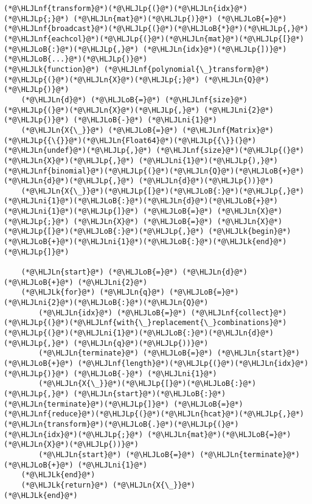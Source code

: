 \documentclass[12pt,a4paper]{article}
\newcommand{\HLJLk}[1]{\textcolor[RGB]{148,91,176}{\textbf{#1}}}
\newcommand{\HLJLn}[1]{#1}
\newcommand{\HLJLnf}[1]{\textcolor[RGB]{66,102,213}{#1}}
\newcommand{\HLJLni}[1]{\textcolor[RGB]{59,151,46}{#1}}
\newcommand{\HLJLoB}[1]{\textcolor[RGB]{102,102,102}{\textbf{#1}}}
\newcommand{\HLJLp}[1]{#1}
\begin{document}
\begin{lstlisting}
(*@\HLJLnf{transform}@*)(*@\HLJLp{(}@*)(*@\HLJLn{idx}@*)(*@\HLJLp{;}@*) (*@\HLJLn{mat}@*)(*@\HLJLp{)}@*) (*@\HLJLoB{=}@*) (*@\HLJLnf{broadcast}@*)(*@\HLJLp{(}@*)(*@\HLJLoB{*}@*)(*@\HLJLp{,}@*) (*@\HLJLnf{eachcol}@*)(*@\HLJLp{(}@*)(*@\HLJLn{mat}@*)(*@\HLJLp{[}@*)(*@\HLJLoB{:}@*)(*@\HLJLp{,}@*) (*@\HLJLn{idx}@*)(*@\HLJLp{])}@*)(*@\HLJLoB{...}@*)(*@\HLJLp{)}@*)
(*@\HLJLk{function}@*) (*@\HLJLnf{polynomial{\_}transform}@*)(*@\HLJLp{(}@*)(*@\HLJLn{X}@*)(*@\HLJLp{;}@*) (*@\HLJLn{Q}@*)(*@\HLJLp{)}@*)
    (*@\HLJLn{d}@*) (*@\HLJLoB{=}@*) (*@\HLJLnf{size}@*)(*@\HLJLp{(}@*)(*@\HLJLn{X}@*)(*@\HLJLp{,}@*) (*@\HLJLni{2}@*)(*@\HLJLp{)}@*) (*@\HLJLoB{-}@*) (*@\HLJLni{1}@*)
    (*@\HLJLn{X{\_}}@*) (*@\HLJLoB{=}@*) (*@\HLJLnf{Matrix}@*)(*@\HLJLp{{\{}}@*)(*@\HLJLn{Float64}@*)(*@\HLJLp{{\}}(}@*)(*@\HLJLn{undef}@*)(*@\HLJLp{,}@*) (*@\HLJLnf{size}@*)(*@\HLJLp{(}@*)(*@\HLJLn{X}@*)(*@\HLJLp{,}@*) (*@\HLJLni{1}@*)(*@\HLJLp{),}@*) (*@\HLJLnf{binomial}@*)(*@\HLJLp{(}@*)(*@\HLJLn{Q}@*)(*@\HLJLoB{+}@*)(*@\HLJLn{d}@*)(*@\HLJLp{,}@*) (*@\HLJLn{d}@*)(*@\HLJLp{))}@*)
    (*@\HLJLn{X{\_}}@*)(*@\HLJLp{[}@*)(*@\HLJLoB{:}@*)(*@\HLJLp{,}@*) (*@\HLJLni{1}@*)(*@\HLJLoB{:}@*)(*@\HLJLn{d}@*)(*@\HLJLoB{+}@*)(*@\HLJLni{1}@*)(*@\HLJLp{]}@*) (*@\HLJLoB{=}@*) (*@\HLJLn{X}@*)(*@\HLJLp{;}@*) (*@\HLJLn{X}@*) (*@\HLJLoB{=}@*) (*@\HLJLn{X}@*)(*@\HLJLp{[}@*)(*@\HLJLoB{:}@*)(*@\HLJLp{,}@*) (*@\HLJLk{begin}@*)(*@\HLJLoB{+}@*)(*@\HLJLni{1}@*)(*@\HLJLoB{:}@*)(*@\HLJLk{end}@*)(*@\HLJLp{]}@*)

    (*@\HLJLn{start}@*) (*@\HLJLoB{=}@*) (*@\HLJLn{d}@*) (*@\HLJLoB{+}@*) (*@\HLJLni{2}@*)
    (*@\HLJLk{for}@*) (*@\HLJLn{q}@*) (*@\HLJLoB{=}@*) (*@\HLJLni{2}@*)(*@\HLJLoB{:}@*)(*@\HLJLn{Q}@*)
        (*@\HLJLn{idx}@*) (*@\HLJLoB{=}@*) (*@\HLJLnf{collect}@*)(*@\HLJLp{(}@*)(*@\HLJLnf{with{\_}replacement{\_}combinations}@*)(*@\HLJLp{(}@*)(*@\HLJLni{1}@*)(*@\HLJLoB{:}@*)(*@\HLJLn{d}@*)(*@\HLJLp{,}@*) (*@\HLJLn{q}@*)(*@\HLJLp{))}@*)
        (*@\HLJLn{terminate}@*) (*@\HLJLoB{=}@*) (*@\HLJLn{start}@*) (*@\HLJLoB{+}@*) (*@\HLJLnf{length}@*)(*@\HLJLp{(}@*)(*@\HLJLn{idx}@*)(*@\HLJLp{)}@*) (*@\HLJLoB{-}@*) (*@\HLJLni{1}@*)
        (*@\HLJLn{X{\_}}@*)(*@\HLJLp{[}@*)(*@\HLJLoB{:}@*)(*@\HLJLp{,}@*) (*@\HLJLn{start}@*)(*@\HLJLoB{:}@*)(*@\HLJLn{terminate}@*)(*@\HLJLp{]}@*) (*@\HLJLoB{=}@*) (*@\HLJLnf{reduce}@*)(*@\HLJLp{(}@*)(*@\HLJLn{hcat}@*)(*@\HLJLp{,}@*) (*@\HLJLn{transform}@*)(*@\HLJLoB{.}@*)(*@\HLJLp{(}@*)(*@\HLJLn{idx}@*)(*@\HLJLp{;}@*) (*@\HLJLn{mat}@*)(*@\HLJLoB{=}@*)(*@\HLJLn{X}@*)(*@\HLJLp{))}@*)
        (*@\HLJLn{start}@*) (*@\HLJLoB{=}@*) (*@\HLJLn{terminate}@*) (*@\HLJLoB{+}@*) (*@\HLJLni{1}@*)
    (*@\HLJLk{end}@*)
    (*@\HLJLk{return}@*) (*@\HLJLn{X{\_}}@*)
(*@\HLJLk{end}@*)



\end{lstlisting}
\end{document}
